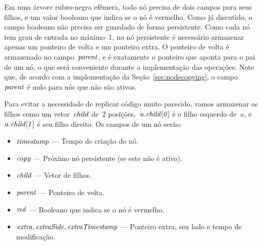 \documentclass[../../main.tex]{subfiles}
\begin{document}
Em uma árvore rubro-negra efêmera, todo nó precisa de dois campos para seus filhos, e um valor booleano que indica se o nó é vermelho. Como já discutido, o campo booleano não precisa ser guardado de forma persistente. Como cada nó tem grau de entrada no máximo~1, no nó persistente é necessário armazenar apenas um ponteiro de volta e um ponteiro extra. O ponteiro de volta é armazenado no campo~$\mathit{parent}$, e é exatamente o ponteiro que aponta para o pai de um nó, o que será conveniente durante a implementação das operações. Note que, de acordo com a implementação da Seção~\ref{sec:nodecopying}, o campo~$\mathit{parent}$ é nulo para nós que não são ativos.

Para evitar a necessidade de replicar código muito parecido, vamos armazenar os filhos como um vetor~$\mathit{child}$ de~2 posições,~$u.\mathit{child[0]}$ é o filho esquerdo de~$u$, e~$u.\mathit{child[1]}$ é seu filho direito. Os campos de um nó serão:
\begin{itemize}
\item $\mathit{timestamp}$ --- Tempo de criação do nó.
\item $\mathit{copy}$ --- Próximo nó persistente (se este não é ativo).
\item $\mathit{child}$ --- Vetor de filhos.
\item $\mathit{parent}$ --- Ponteiro de volta.
\item $\mathit{red}$ --- Booleano que indica se o nó é vermelho.
\item $\mathit{extra}, \mathit{extraSide}, \mathit{extraTimestamp}$ --- Ponteiro extra, seu lado e tempo de modificação.
\end{itemize}
\end{document}
